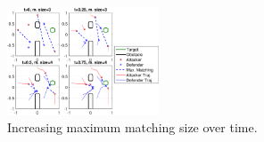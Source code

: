 \begin{figure}
	\centering
	\includegraphics[width=0.4\textwidth]{"fig/time varying graph"}
	\caption{Increasing maximum matching size over time.}
	\label{fig:real_time_update}
\end{figure}
